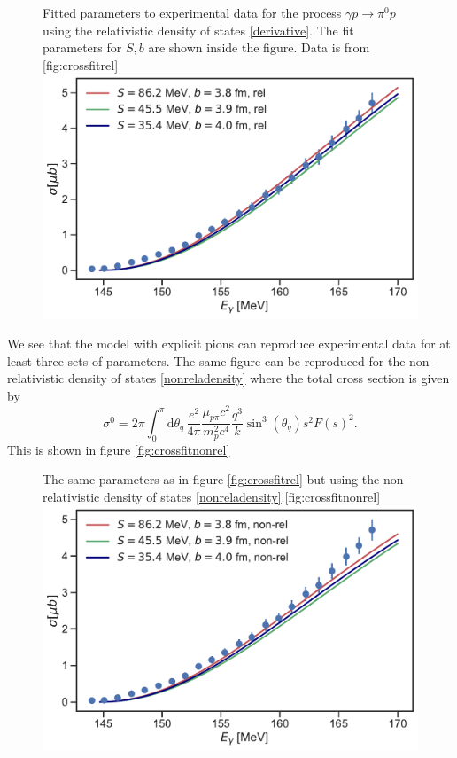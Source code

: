 \begin{figure}[H]
	\begin{sidecaption}{Fitted parameters to experimental data for the process $\gamma p \rightarrow \pi^0 p$ using the relativistic density of states \eqref{derivative}. The fit parameters for $S,b$ are shown inside the figure. Data is from \cite{Schmidt_2001}}[fig:crossfitrel]
		\includegraphics[width=\linewidth]{Figures/crossfit_rel.pdf}
	\end{sidecaption}
\end{figure}
We see that the model with explicit pions can reproduce experimental data for at least three sets of parameters. The same figure can be reproduced for the non-relativistic density of states \eqref{nonreladensity} where the total cross section is given by
\begin{equation} \label{nonrelcrossfit}
	\sigma^0 = 2\pi \int_0^\pi \text{d}\theta_q \, \frac{e^2}{4\pi}\frac{\mu_{p\pi}c^2}{m_p^2 c^4}\frac{q^3}{k}\sin^3(\theta_q)s^2 F(s)^2.
\end{equation} 
This is shown in figure \ref{fig:crossfitnonrel}
\begin{figure}[H]
	\begin{sidecaption}{The same parameters as in figure \ref{fig:crossfitrel} but using the non-relativistic density of states \eqref{nonreladensity}.}[fig:crossfitnonrel]
		\includegraphics[width=\linewidth]{Figures/crossfit_nonrel.pdf} 
	\end{sidecaption}
\end{figure}

